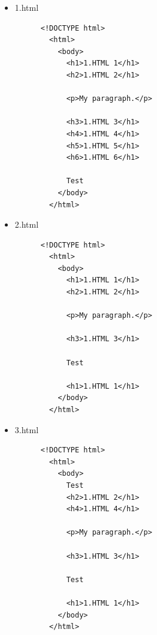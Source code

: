 \documentclass[]{article}
\begin{document}
\begin{itemize}
  \item 1.html
    \begin{lstlisting}
      <!DOCTYPE html>
        <html>
          <body>
            <h1>1.HTML 1</h1>
            <h2>1.HTML 2</h1>
            
            <p>My paragraph.</p>

            <h3>1.HTML 3</h1>
            <h4>1.HTML 4</h1>
            <h5>1.HTML 5</h1>
            <h6>1.HTML 6</h1>

            Test
          </body>
        </html>
    \end{lstlisting}
  \item 2.html
    \begin{lstlisting}
      <!DOCTYPE html>
        <html>
          <body>
            <h1>1.HTML 1</h1>
            <h2>1.HTML 2</h1>
            
            <p>My paragraph.</p>

            <h3>1.HTML 3</h1>

            Test

            <h1>1.HTML 1</h1>
          </body>
        </html>
    \end{lstlisting}
  \item 3.html
     \begin{lstlisting}
      <!DOCTYPE html>
        <html>
          <body>
            Test
            <h2>1.HTML 2</h1>
            <h4>1.HTML 4</h1>
            
            <p>My paragraph.</p>

            <h3>1.HTML 3</h1>

            Test

            <h1>1.HTML 1</h1>
          </body>
        </html>
    \end{lstlisting}
\end{itemize}
\end{document}
